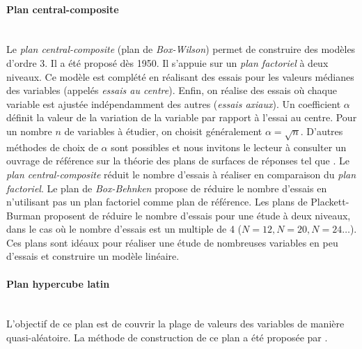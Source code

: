 \paragraph{Plan central-composite}\mbox{\label{parag:doe_cc}} \\
Le \textit{plan central-composite} (plan de \textit{Box-Wilson}) permet de construire des modèles d'ordre 3.
Il a été proposé dès 1950.
Il s'appuie sur un \textit{plan factoriel} à deux niveaux.
Ce modèle est complété en réalisant des essais pour les valeurs médianes des variables (appelés \textit{essais au centre}).
Enfin, on réalise des essais où chaque variable est ajustée indépendamment des autres (\textit{essais axiaux}).
Un coefficient $\alpha$ définit la valeur de la variation de la variable par rapport à l'essai au centre.
Pour un nombre $n$ de variables à étudier, on choisit généralement $\alpha = \sqrt{n}$.
D'autres méthodes de choix de $\alpha$ sont possibles et nous invitons le lecteur à consulter un ouvrage de référence sur la théorie des plans de surfaces de réponses tel que \cite{myers_response_1971}.
Le \textit{plan central-composite} réduit le nombre d'essais à réaliser en comparaison du \textit{plan factoriel}.
Le plan de \textit{Box-Behnken} propose de réduire le nombre d'essais en n'utilisant pas un plan factoriel comme plan de référence.
Les plans de Plackett-Burman \cite{plackett_design_1946} proposent de réduire le nombre d'essais pour une étude à deux niveaux, dans le cas où le nombre d'essais est un multiple de 4 ($N=12, N=20, N=24 \dots$).
Ces plans sont idéaux pour réaliser une étude de nombreuses variables en peu d'essais et construire un modèle linéaire.

\paragraph{Plan hypercube latin}\mbox{\label{parag:doe_lhs}} \\
L'objectif de ce plan est de couvrir la plage de valeurs des variables de manière quasi-aléatoire.
La méthode de construction de ce plan a été proposée par \cite{mckay_comparison_1979}. %

